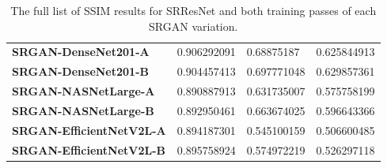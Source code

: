 \begin{appendices}
\begin{table}[h!]
\begin{tabular}{llll}
        \textbf{SRGAN-DenseNet201-A} & 0.906292091 & 0.68875187 & 0.625844913 \\ 
        \textbf{SRGAN-DenseNet201-B} & 0.904457413 & 0.697771048 & 0.629857361 \\ 
        \textbf{SRGAN-NASNetLarge-A} & 0.890887913 & 0.631735007 & 0.575758199 \\ 
        \textbf{SRGAN-NASNetLarge-B} & 0.892950461 & 0.663674025 & 0.596643366 \\ 
        \textbf{SRGAN-EfficientNetV2L-A} & 0.894187301 & 0.545100159 & 0.506600485 \\ 
        \textbf{SRGAN-EfficientNetV2L-B} & 0.895758924 & 0.574972219 & 0.526297118 \\
        \bottomrule
    \end{tabular}
    \caption{The full list of SSIM results for SRResNet and both training passes of each SRGAN variation.}
\end{table}
\clearpage

\end{appendices}

